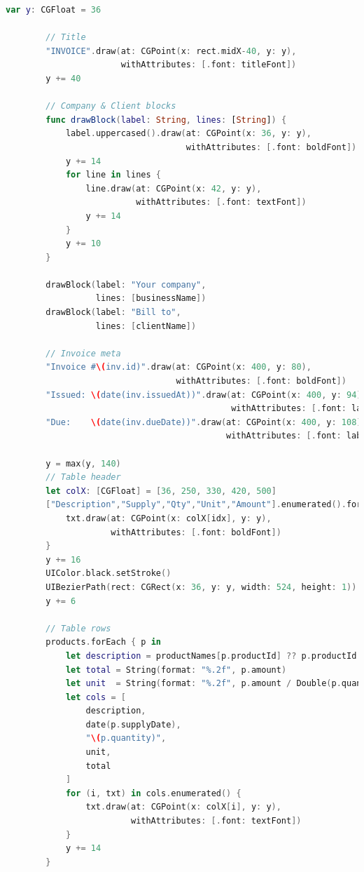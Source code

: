 \begin{large}
\begin{lstlisting}[language={swift}, caption={Servicio para generar PDF de facturas}]
        var y: CGFloat = 36
        
        // Title
        "INVOICE".draw(at: CGPoint(x: rect.midX-40, y: y),
                       withAttributes: [.font: titleFont])
        y += 40
        
        // Company & Client blocks
        func drawBlock(label: String, lines: [String]) {
            label.uppercased().draw(at: CGPoint(x: 36, y: y),
                                    withAttributes: [.font: boldFont])
            y += 14
            for line in lines {
                line.draw(at: CGPoint(x: 42, y: y),
                          withAttributes: [.font: textFont])
                y += 14
            }
            y += 10
        }
        
        drawBlock(label: "Your company",
                  lines: [businessName])
        drawBlock(label: "Bill to",
                  lines: [clientName])
        
        // Invoice meta
        "Invoice #\(inv.id)".draw(at: CGPoint(x: 400, y: 80),
                                  withAttributes: [.font: boldFont])
        "Issued: \(date(inv.issuedAt))".draw(at: CGPoint(x: 400, y: 94),
                                             withAttributes: [.font: labelFont])
        "Due:    \(date(inv.dueDate))".draw(at: CGPoint(x: 400, y: 108),
                                            withAttributes: [.font: labelFont])
        
        y = max(y, 140)
        // Table header
        let colX: [CGFloat] = [36, 250, 330, 420, 500]
        ["Description","Supply","Qty","Unit","Amount"].enumerated().forEach { idx, txt in
            txt.draw(at: CGPoint(x: colX[idx], y: y),
                     withAttributes: [.font: boldFont])
        }
        y += 16
        UIColor.black.setStroke()
        UIBezierPath(rect: CGRect(x: 36, y: y, width: 524, height: 1)).fill()
        y += 6
        
        // Table rows
        products.forEach { p in
            let description = productNames[p.productId] ?? p.productId
            let total = String(format: "%.2f", p.amount)
            let unit  = String(format: "%.2f", p.amount / Double(p.quantity))
            let cols = [
                description,
                date(p.supplyDate),
                "\(p.quantity)",
                unit,
                total
            ]
            for (i, txt) in cols.enumerated() {
                txt.draw(at: CGPoint(x: colX[i], y: y),
                         withAttributes: [.font: textFont])
            }
            y += 14
        }
        

\end{lstlisting}
\end{large}
